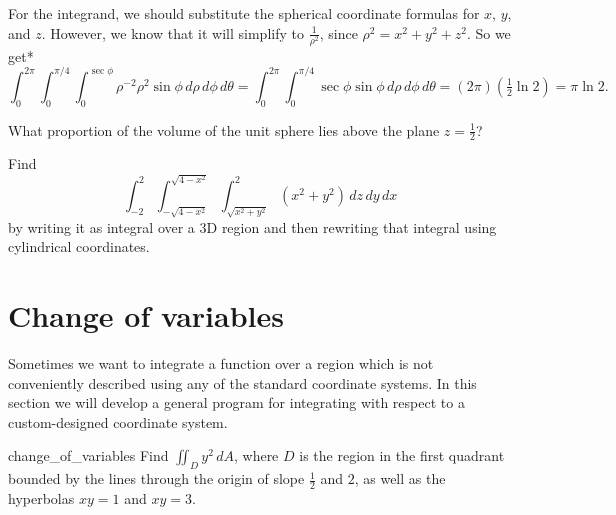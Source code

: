 \documentclass[svgnames]{watsonbook}
\begin{document}
\begin{solution}
For the integrand, we should substitute the spherical coordinate
formulas for $x$, $y$, and $z$. However, we know that it will simplify
to $\frac{1}{\rho^2}$, since $\rho^2 = x^2 + y^2 + z^2$. So we get*
\[
  \int_{0}^{2\pi}\int_0^{\pi/4} \int_0^{\sec \phi} \rho^{-2} \rho^2 \sin
  \phi \, d\rho \, d\phi \, d\theta =
  \int_{0}^{2\pi}\int_0^{\pi/4} \sec\phi \sin
  \phi \, d\rho \, d\phi \, d\theta = (2\pi)(\tfrac{1}{2} \ln 2) =
  \boxed{\pi \ln 2}.
\]
\end{solution}

\begin{exercise}{}{}
  What proportion of the volume of the unit sphere lies above the
  plane $z = \tfrac{1}{2}$?
\end{exercise}

\begin{exercise}{}{}
  Find \[\int_{-2}^2 \int_{-\sqrt{4-x^2}}^{\sqrt{4-x^2}}
  \int_{\sqrt{x^2 + y^2}}^2 (x^2 + y^2) \, dz \, dy \, dx\] by writing
  it as integral over a 3D region and then rewriting that integral
  using cylindrical coordinates. 
\end{exercise}

\section{Change of variables} \label{sec:changeofvariables}


Sometimes we want to integrate a function over a region which is not
conveniently described using any of the standard coordinate
systems. In this section we will develop a general program for
integrating with respect to a custom-designed coordinate system.

\begin{example}{}{change_of_variables}
  Find $\iint_D y^2 \, dA$, where $D$ is the region in the first
  quadrant bounded by the lines
  through the origin of slope $\tfrac{1}{2}$ and $2$, as well as the
  hyperbolas $xy = 1$ and $xy = 3$. 
\end{example}
\end{document}

